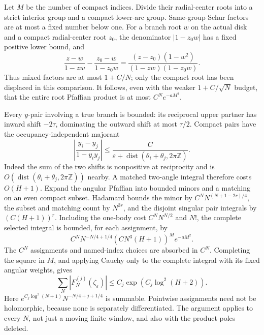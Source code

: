 \documentclass[11pt]{article}
\numberwithin{equation}{section}
\theoremstyle{definition}
\newcommand{\Z}{\mathbb Z}
\newcommand{\eps}{\varepsilon}
\DeclareMathOperator{\dist}{dist}
\begin{document}
Let $M$ be the number of compact indices. Divide their radial-center roots
into a strict interior group and a compact lower-arc group. Same-group
Schur factors are at most a fixed number below one. For a branch root
$w$ on the actual disk and a compact radial-center root $z_0$, the
denominator $|1-z_0w|$ has a fixed positive lower bound, and
\[
 \frac{z-w}{1-zw}-\frac{z_0-w}{1-z_0w}
 =\frac{(z-z_0)(1-w^2)}{(1-zw)(1-z_0w)}.
\]
Thus mixed factors are at most $1+C/N$; only the compact root has been
displaced in this comparison. It follows, even with the weaker
$1+C/\sqrt N$ budget, that the entire root Pfaffian product is at most
$C^N e^{-aM^2}$.

Every $y$-pair involving a true branch is bounded: its reciprocal upper
partner has inward shift $-2\tau$, dominating the outward shift at most
$\tau/2$. Compact pairs have the occupancy-independent majorant
\[
 \left|\frac{y_i-y_j}{1-y_iy_j}\right|
 \le\frac C{\eps+\dist(\theta_i+\theta_j,2\pi\Z)}.
\]
Indeed the sum of the two shifts is nonpositive at reciprocity and is
$O(\dist(\theta_i+\theta_j,2\pi\Z))$ nearby. A matched two-angle
integral therefore costs $O(H+1)$.
Expand the angular Pfaffian into bounded minors and a matching on an
even compact subset. Hadamard bounds the minor by
$C^N N^{(N+1-2r)/4}$, the subset and matching count by $N^{3r}$,
and the disjoint singular pair integrals by $(C(H+1))^r$.
Including the one-body cost $C^NN^{N/2}$ and $N!$, the complete
selected integral is bounded, for each assignment, by
\[
 C^N N^{-N/4+1/4}(CN^3(H+1))^M e^{-aM^2}.
\]
The $C^N$ assignments and named-index choices are absorbed in $C^N$.
Completing the square in $M$, and applying Cauchy only to the complete
integral with its fixed angular weights, gives
\begin{equation}
 \sum_N|F_N^{(j)}(\zeta_\eps)|
 \le C_j\exp(C_j\log^2(H+2)).
 \label{iso:selected-bound}
\end{equation}
Here $e^{C_j\log^2(N+1)}N^{-N/4+j+1/4}$ is summable.
Pointwise assignments need not be holomorphic, because none is separately
differentiated. The argument applies to every $N$, not just a moving
finite window, and also with the product poles deleted.
\end{document}
